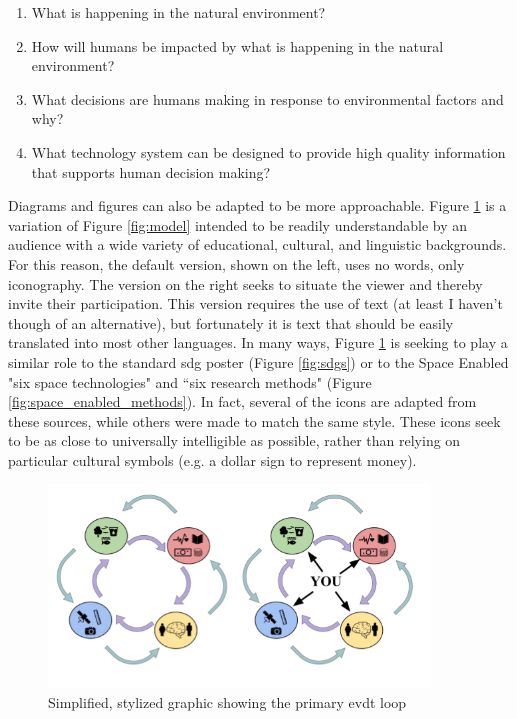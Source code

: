 \begin{enumerate} \setlength{\itemsep}{0pt} \setlength{\parskip}{0pt}
    \item What is happening in the natural environment?
    \item How will humans be impacted by what is happening in the natural environment?
    \item What decisions are humans making in response to environmental factors and why?
    \item What technology system can be designed to provide high quality information that supports human decision making?
\end{enumerate}

Diagrams and figures can also be adapted to be more approachable. Figure \ref{fig:evdt_public} is a variation of Figure \ref{fig:model} intended to be readily understandable by an audience with a wide variety of educational, cultural, and linguistic backgrounds. For this reason, the default version, shown on the left, uses no words, only iconography. The version on the right seeks to situate the viewer and thereby invite their participation. This version requires the use of text (at least I haven't though of an alternative), but fortunately it is text that should be easily translated into most other languages. In many ways, Figure \ref{fig:evdt_public} is seeking to play a similar role to the standard \ac{sdg} poster (Figure \ref{fig:sdgs}) or to the Space Enabled "six space technologies" and ``six research methods" (Figure \ref{fig:space_enabled_methods}). In fact, several of the icons are adapted from these sources, while others were made to match the same style. These icons seek to be as close to universally intelligible as possible, rather than relying on particular cultural symbols (e.g. a dollar sign to represent money). 

\begin{figure}[!htb]
	\centering
	\includegraphics[width=0.9\textwidth]{Figures/chap3/evdt_circle.png}
	\caption[Simplified, stylized graphic showing the primary EVDT loop]{Simplified, stylized graphic showing the primary \ac{evdt} loop}
	\label{fig:evdt_public}
\end{figure}

